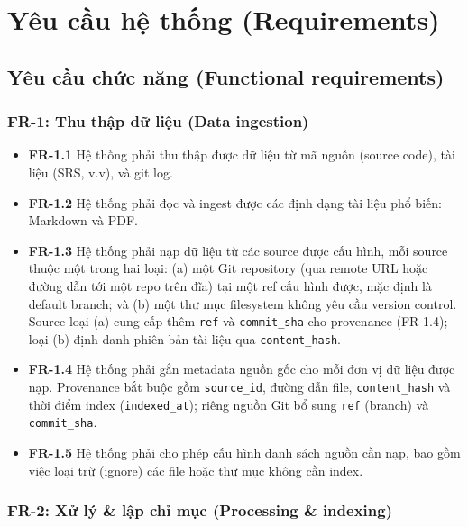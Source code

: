 \section{Yêu cầu hệ thống (Requirements)}

\subsection{Yêu cầu chức năng (Functional requirements)}

\subsubsection*{FR-1: Thu thập dữ liệu (Data ingestion)}

\begin{itemize}
  \item \textbf{FR-1.1} Hệ thống phải thu thập được dữ liệu từ mã nguồn (source code), tài liệu (SRS, v.v), và git log.
  \item \textbf{FR-1.2} Hệ thống phải đọc và ingest được các định dạng tài liệu phổ biến: Markdown và PDF.
  \item \textbf{FR-1.3} Hệ thống phải nạp dữ liệu từ các source được cấu hình, mỗi source thuộc một trong hai loại: (a) một Git repository (qua remote URL hoặc đường dẫn tới một repo trên đĩa) tại một ref cấu hình được, mặc định là default branch; và (b) một thư mục filesystem không yêu cầu version control. Source loại (a) cung cấp thêm \texttt{ref} và \texttt{commit\_sha} cho provenance (FR-1.4); loại (b) định danh phiên bản tài liệu qua \texttt{content\_hash}.
  \item \textbf{FR-1.4} Hệ thống phải gắn metadata nguồn gốc cho mỗi đơn vị dữ liệu được nạp. Provenance bắt buộc gồm \texttt{source\_id}, đường dẫn file, \texttt{content\_hash} và thời điểm index (\texttt{indexed\_at}); riêng nguồn Git bổ sung \texttt{ref} (branch) và \texttt{commit\_sha}.
  \item \textbf{FR-1.5} Hệ thống phải cho phép cấu hình danh sách nguồn cần nạp, bao gồm việc loại trừ (ignore) các file hoặc thư mục không cần index.
\end{itemize}

\subsubsection*{FR-2: Xử lý \& lập chỉ mục (Processing \& indexing)}

